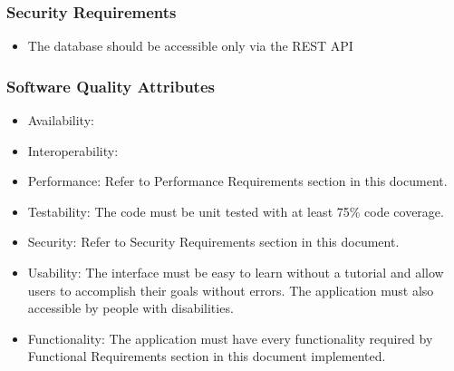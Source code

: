 \documentclass[a4paper]{article}
\begin{document}
    \subsubsection{Security Requirements}
    \begin{itemize}
        \item The database should be accessible only via the REST API
    \end{itemize}

    \subsubsection{Software Quality Attributes}
    \begin{itemize}
        \item Availability: %
        \item Interoperability: %
        \item Performance: Refer to Performance Requirements section in this document.
        \item Testability: The code must be unit tested with at least 75\% code coverage.
        \item Security: Refer to Security Requirements section in this document.
        \item Usability: The interface must be easy to learn without a tutorial and allow users to accomplish their goals without errors. The application must also accessible by people with disabilities.
        \item Functionality: The application must have every functionality required by Functional Requirements section in this document implemented.
    \end{itemize}
\end{document}
